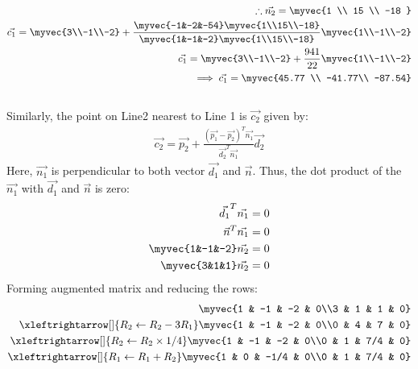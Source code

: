 \documentclass[journal,12pt,twocolumn]{IEEEtran}
\begin{document}
\begin{align}
    \therefore \vec{n_2}=\myvec{1 \\ 15 \\ -18 }\\
\vec{c_1}= \myvec{3\\-1\\-2}+\frac{\myvec{-1&-2&-54} \myvec{1\\15\\-18}}{\myvec{1&-1&-2} \myvec{1\\15\\-18}}\myvec{1\\-1\\-2}\\
\vec{c_1}= \myvec{3\\-1\\-2}+\frac{941}{22}\myvec{1\\-1\\-2}\\
\implies \vec{c_1}=\myvec{45.77 \\ -41.77\\ -87.54}
\end{align}
\\
Similarly, the point on Line2 nearest to Line 1 is $\vec{c_2}$ given by:\\
\begin{align}
\vec{c_2}=\vec{p_2}+\frac{(\vec{p_1}-\vec{p_2})^T \vec{n_1}}{\vec{d_2}^T \vec{n_1}}\vec{d_2} 
\end{align}
Here, $\Vec{n_1}$ is perpendicular to both vector $\Vec{d_1}$ and $\Vec{n}$. Thus, the dot product of the $\Vec{n_1}$ with $\Vec{d_1}$ and $\Vec{n}$ is zero:
\\
\begin{align}
    \vec{d_1}^T\vec{n_1} =  0\\
    \vec{n}^T\vec{n_1} =  0\\
    \myvec{1&-1&-2}\vec{n_2}=0\\
    \myvec{3&1&1}\vec{n_2}=0
\end{align}
Forming augmented matrix and reducing the rows:
\begin{align}
\myvec{1 & -1 & -2 & 0\\3 & 1 & 1 & 0}\\
\xleftrightarrow[]{R_2\leftarrow R_2-3R_1}
\myvec{1 & -1 & -2 & 0\\0 & 4 & 7 & 0}\\
\xleftrightarrow[]{R_2\leftarrow R_2\times1/4}
\myvec{1 & -1 & -2 & 0\\0 & 1 & 7/4 & 0}\\
\xleftrightarrow[]{R_1\leftarrow R_1+R_2}
\myvec{1 & 0 & -1/4 & 0\\0 & 1 & 7/4 & 0}
\end{align} 
\end{document}
